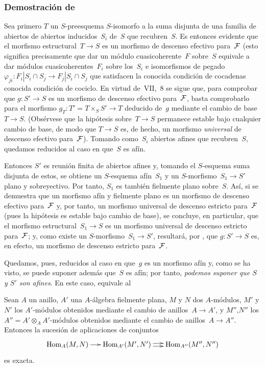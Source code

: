\subsubsection*{Demostración de~}
Sea
primero $T$ un $S$-preesquema $S$-isomorfo a la suma disjunta de una
familia
{de abiertos}
{de abiertos}
inducidos~$S_{i}$ de~$S$ que recubren~$S$. Es entonces evidente que el
morfismo estructural~$T\to S$ es un morfismo de descenso efectivo
para~$\cal{F}$ (esto significa precisamente que dar un módulo
cuasicoherente~$F$ sobre~$S$ equivale a dar módulos cuasicoherentes~$F_{i}$
sobre los~$S_{i}$ e isomorfismos de pegado~$\varphi_{ji}\colon
F_{i}|S_{i}\cap S_{j}\to F_{j}|S_{i}\cap S_{j}$ que satisfacen la
{conocida condición de cocadenas}
{conocida condición de cociclo}.
En virtud de~VII,~8
se sigue que, para comprobar que $g\colon S'\to S$ es un morfismo de
descenso efectivo para~$\cal{F}$, basta comprobarlo para el morfismo
$g_{T}\colon T'=T\times_{S}S'\to T$ deducido de~$g$ mediante el cambio de
base~$T\to S$. (Obsérvese que la hipótesis sobre~$T\to S$ permanece
estable bajo cualquier cambio de base, de modo que $T\to S$ es, de
hecho, un morfismo \emph{universal} de descenso efectivo para~$\cal{F}$).
Tomando como~$S_{i}$ abiertos afines que recubren~$S$, quedamos reducidos al
caso en que~$S$ es afín.

Entonces $S'$ es reunión finita de abiertos afines y, tomando el
$S$-esquema suma disjunta de estos, se obtiene un $S$-esquema afín~$S_{1}$
y un $S$-morfismo~$S_{1}\to S'$ plano y sobreyectivo. Por tanto, $S_{1}$ es
también fielmente plano sobre~$S$. Así, si se demuestra que un morfismo
afín y fielmente plano es un morfismo de descenso efectivo para~$\cal{F}$
y, por tanto, un morfismo universal de descenso estricto para~$\cal{F}$
(pues la hipótesis es estable bajo cambio de base), se concluye, en
particular, que el morfismo estructural~$S_{1}\to S$ es un morfismo
universal de descenso estricto para~$\cal{F}$; y, como existe un
$S$-morfismo~$S_{1}\to S'$, resultará, por \cite{VIII.D}, que
$g\colon S'\to S$ es, en efecto, un morfismo de descenso estricto
para~$\cal{F}$.

{\enlargethispage{.5cm}}%
Quedamos, pues, reducidos al caso en que~$g$ es un morfismo afín y, como
se ha visto, se puede suponer además que~$S$ es afín; por tanto,
\emph{podemos suponer que $S$ y $S'$ son afines}. En este caso,
 equivale al

\begin{lemme}
\label{VIII.1.4}
Sean $A$ un anillo, $A'$ una $A$-álgebra fielmente plana, $M$ y $N$ dos
$A$-módulos, $M'$ y $N'$ los $A'$-módulos obtenidos mediante el cambio
de anillos~$A\to A'$, y $M''$,$N''$ los
$A''=A'\otimes_{A}A'$-módulos obtenidos mediante el cambio de
anillos~$A\to A''$. Entonces la sucesión de aplicaciones de conjuntos
$$
\xymatrix@C=.5cm{\Hom_{A}(M,N)\ar[r] &
\Hom_{A'}(M',N')\ar@/^2pt/[r]\ar@/_2pt/[r] &
\Hom_{A''}(M'',N'')}
$$
es exacta.
\end{lemme}

